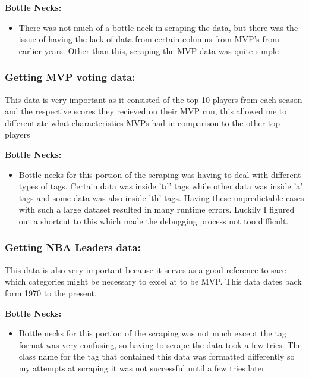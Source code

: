 \documentclass[11pt]{article}
\providecommand{\tightlist}{%
      \setlength{\itemsep}{0pt}\setlength{\parskip}{0pt}}
\begin{document}
\textbf{Bottle Necks:}

\begin{itemize}
\tightlist
\item
  There was not much of a bottle neck in scraping the data, but there
  was the issue of having the lack of data from certain columns from
  MVP's from earlier years. Other than this, scraping the MVP data was
  quite simple
\end{itemize}

    \subsubsection{Getting MVP voting data:}\label{getting-mvp-voting-data}

This data is very important as it consisted of the top 10 players from
each season and the respective scores they recieved on their MVP run,
this allowed me to differentiate what characteristics MVPs had in
comparison to the other top players \newline

\textbf{Bottle Necks:}

\begin{itemize}
\tightlist
\item
  Bottle necks for this portion of the scraping was having to deal with
  different types of tags. Certain data was inside 'td' tags while other
  data was inside 'a' tags and some data was also inside 'th' tags.
  Having these unpredictable cases with such a large dataset resulted in
  many runtime errors. Luckily I figured out a shortcut to this which
  made the debugging process not too difficult.
\end{itemize}

    \subsubsection{Getting NBA Leaders
data:}\label{getting-nba-leaders-data}

This data is also very important because it serves as a good reference
to saee which categories might be necessary to excel at to be MVP. This
data dates back form 1970 to the present. \newline

\textbf{Bottle Necks:}

\begin{itemize}
\tightlist
\item
  Bottle necks for this portion of the scraping was not much except the
  tag format was very confusing, so having to scrape the data took a few
  tries. The class name for the tag that contained this data was
  formatted differently so my attempts at scraping it was not successful
  until a few tries later.
\end{itemize}
\end{document}
